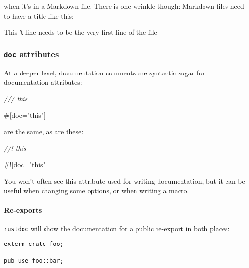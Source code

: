 \documentclass[a4paper,]{book}
\newenvironment{Shaded}{\begin{snugshade}}{\end{snugshade}}
\newcommand{\StringTok}[1]{\textcolor[rgb]{0.31,0.60,0.02}{{#1}}}
\newcommand{\CommentTok}[1]{\textcolor[rgb]{0.56,0.35,0.01}{\textit{{#1}}}}
\newcommand{\OtherTok}[1]{\textcolor[rgb]{0.56,0.35,0.01}{{#1}}}
\newcommand{\NormalTok}[1]{{#1}}
\let\oldparagraph\paragraph
\renewcommand{\paragraph}[1]{\oldparagraph{#1}\mbox{}}
\begin{document}
when it's in a Markdown file. There is one wrinkle though: Markdown
files need to have a title like this:

\begin{Shaded}
\end{Shaded}

This \texttt{\%} line needs to be the very first line of the file.

\subsubsection{\texorpdfstring{\texttt{doc}
attributes}{doc attributes}}\label{doc-attributes}

At a deeper level, documentation comments are syntactic sugar for
documentation attributes:

\begin{Shaded}
\begin{Highlighting}[]
\CommentTok{/// this}

\OtherTok{#[}\NormalTok{doc}\OtherTok{=}\StringTok{"this"}\OtherTok{]}
\end{Highlighting}
\end{Shaded}

are the same, as are these:

\begin{Shaded}
\begin{Highlighting}[]
\CommentTok{//! this}

\NormalTok{#![doc=}\StringTok{"this"}\NormalTok{]}
\end{Highlighting}
\end{Shaded}

You won't often see this attribute used for writing documentation, but
it can be useful when changing some options, or when writing a macro.

\paragraph{Re-exports}\label{re-exports}

\texttt{rustdoc} will show the documentation for a public re-export in
both places:

\begin{verbatim}
extern crate foo;

pub use foo::bar;
\end{verbatim}
\end{document}
